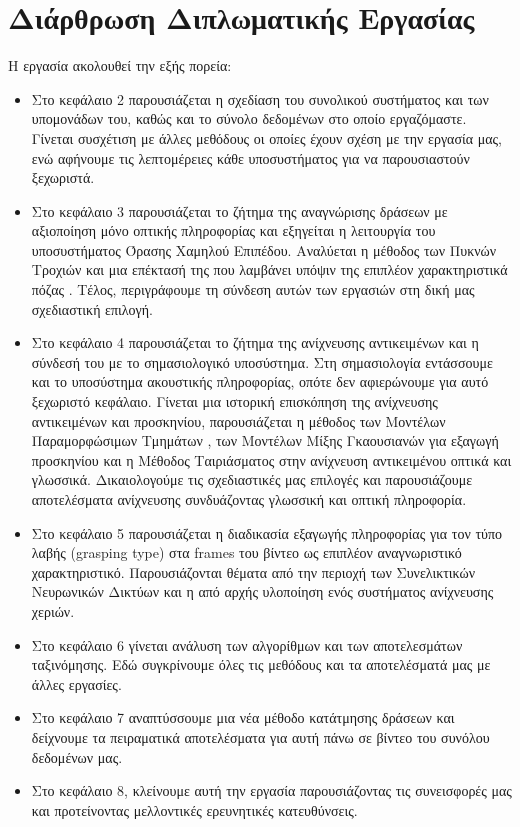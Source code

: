 \documentclass[11pt,a4paper,english,greek,twoside]{../Thesis}
\begin{document}
\section{Διάρθρωση Διπλωματικής Εργασίας}
\par Η εργασία ακολουθεί την εξής πορεία:
\begin{itemize}
	\item Στο κεφάλαιο 2 παρουσιάζεται η σχεδίαση του συνολικού συστήματος και των υπομονάδων του, καθώς και το σύνολο δεδομένων στο οποίο εργαζόμαστε. Γίνεται συσχέτιση με άλλες μεθόδους οι οποίες έχουν σχέση με την εργασία μας, ενώ αφήνουμε τις λεπτομέρειες κάθε υποσυστήματος για να παρουσιαστούν ξεχωριστά.
	\item Στο κεφάλαιο 3 παρουσιάζεται το ζήτημα της αναγνώρισης δράσεων με αξιοποίηση μόνο οπτικής πληροφορίας και εξηγείται η λειτουργία του υποσυστήματος Όρασης Χαμηλού Επιπέδου. Αναλύεται η μέθοδος των Πυκνών Τροχιών \cite{wang_2011} και μια επέκτασή της που λαμβάνει υπόψιν της επιπλέον χαρακτηριστικά πόζας \cite{rohrbach_2012}. Τέλος, περιγράφουμε τη σύνδεση αυτών των εργασιών στη δική μας σχεδιαστική επιλογή.
	\item Στο κεφάλαιο 4 παρουσιάζεται το ζήτημα της ανίχνευσης αντικειμένων και η σύνδεσή του με το σημασιολογικό υποσύστημα. Στη σημασιολογία εντάσσουμε και το υποσύστημα ακουστικής πληροφορίας, οπότε δεν αφιερώνουμε για αυτό ξεχωριστό κεφάλαιο. Γίνεται μια ιστορική επισκόπηση της ανίχνευσης αντικειμένων και προσκηνίου, παρουσιάζεται η μέθοδος των Μοντέλων Παραμορφώσιμων Τμημάτων \cite{felzenszwalb_2008}, των Μοντέλων Μίξης Γκαουσιανών για εξαγωγή προσκηνίου και η Μέθοδος Ταιριάσματος στην ανίχνευση αντικειμένου οπτικά και γλωσσικά. Δικαιολογούμε τις σχεδιαστικές μας επιλογές και παρουσιάζουμε αποτελέσματα ανίχνευσης συνδυάζοντας γλωσσική και οπτική πληροφορία.
	\item Στο κεφάλαιο 5 παρουσιάζεται η διαδικασία εξαγωγής πληροφορίας για τον τύπο λαβής (grasping type) στα frames του βίντεο ως επιπλέον αναγνωριστικό χαρακτηριστικό. Παρουσιάζονται θέματα από την περιοχή των Συνελικτικών Νευρωνικών Δικτύων και η από αρχής υλοποίηση ενός συστήματος ανίχνευσης χεριών.
	\item Στο κεφάλαιο 6 γίνεται ανάλυση των αλγορίθμων και των αποτελεσμάτων ταξινόμησης. Εδώ συγκρίνουμε όλες τις μεθόδους και τα αποτελέσματά μας με άλλες εργασίες.
	\item Στο κεφάλαιο 7 αναπτύσσουμε μια νέα μέθοδο κατάτμησης δράσεων και δείχνουμε τα πειραματικά αποτελέσματα για αυτή πάνω σε βίντεο του συνόλου δεδομένων μας.
	\item Στο κεφάλαιο 8, κλείνουμε αυτή την εργασία παρουσιάζοντας τις συνεισφορές μας και προτείνοντας μελλοντικές ερευνητικές κατευθύνσεις.
\end{itemize}
\end{document}
